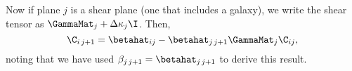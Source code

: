 Now if plane $j$ is a shear plane (one that includes a galaxy), we write the shear tensor as $\GammaMat_j + \Delta \kappa_j \I$. Then,
\begin{equation}
\C_{i \, j +1} = \betahat_{i j}  - \betahat_{j \, j+1} \GammaMat_j \C_{i j},
\end{equation}
noting that we have used $\beta_{j \, j+1} = \betahat_{j\, j+1}$ to derive this result.